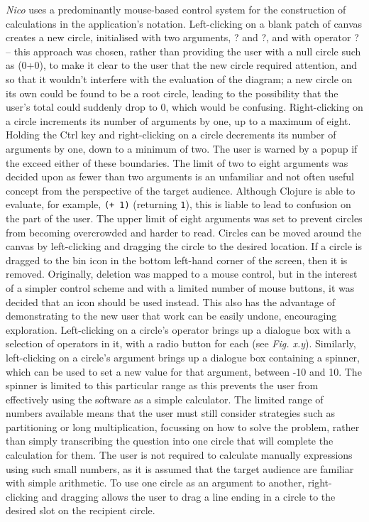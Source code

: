 \documentclass[12pt,twoside,notitlepage,xetex]{report}
\begin{document}
\emph{Nico} uses a predominantly mouse-based control system for the
construction of calculations in the application's notation.  Left-clicking on a
blank patch of canvas creates a new circle, initialised with two arguments,
{\sfapp ?} and {\sfapp ?}, and with operator {\sfapp ?} -- this approach was chosen, rather than providing the user with a null circle such as (0+0), to make it clear to the user that the new circle required attention, and so that it wouldn't interfere with the evaluation of the diagram; a new circle on its own could be found to be a root circle, leading to the possibility that the user's total could suddenly drop to 0, which would be confusing.  Right-clicking on a
circle increments its number of arguments by one, up to a maximum of eight.
Holding the Ctrl key and right-clicking on a circle decrements its number of
arguments by one, down to a minimum of two.  The user is warned by a popup if the exceed either of these boundaries.  The limit of two to eight arguments was decided upon as fewer than two arguments is an unfamiliar and not often useful concept from the perspective of the target audience.  Although Clojure is able to evaluate, for example, \verb¬(+ 1)¬ (returning \verb¬1¬), this is liable to lead to confusion on the part of the user.  The upper limit of eight arguments was set to prevent circles from becoming overcrowded and harder to read.
Circles can be moved around the
canvas by left-clicking and dragging the circle to the desired location.  If a
circle is dragged to the bin icon in the bottom left-hand corner of the screen,
then it is removed.  Originally, deletion was mapped to a mouse control, but in the interest of a simpler control scheme and with a limited number of mouse buttons, it was decided that an icon should be used instead.  This also has the advantage of demonstrating to the new user that work can be easily undone, encouraging exploration.  Left-clicking on a circle's operator brings up a dialogue
box with a selection of operators in it, with a radio button for each (see
\emph{Fig. x.y}).  Similarly, left-clicking on a circle's argument brings up a
dialogue box containing a spinner, which can be used to set a new value for
that argument, between -10 and 10.  The spinner is limited to this particular
range as this prevents the user from effectively using the software as a simple
calculator.  The limited range of numbers available means that the user must
still consider strategies such as partitioning or long multiplication,
focussing on how to solve the problem, rather than simply transcribing the
question into one circle that will complete the calculation for them.  The user is not required to calculate manually expressions using such small numbers, as it is assumed that the target audience are familiar with simple arithmetic.  To use
one circle as an argument to another, right-clicking and dragging allows the
user to drag a line ending in a circle to the desired slot on the recipient
circle.
\end{document}
